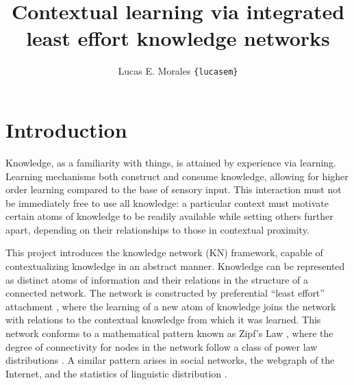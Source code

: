 \documentclass[11pt,letterpaper]{article}
\title{{\Large Contextual learning via integrated least effort knowledge networks}}
\author{Lucas E. Morales \texttt{\{lucasem\}}}
\date{}
\begin{document}
\maketitle

\section{Introduction}

Knowledge, as a familiarity with things, is attained by experience via
learning. Learning mechanisms both construct and consume knowledge, allowing
for higher order learning compared to the base of sensory input. This
interaction must not be immediately free to use all knowledge: a particular
context must motivate certain atoms of knowledge to be readily available
while setting others further apart, depending on their relationships to
those in contextual proximity.

This project introduces the knowledge network (KN) framework, capable of
contextualizing knowledge in an abstract manner. Knowledge can be
represented as distinct atoms of information and their relations in the
structure of a connected network. The network is constructed by preferential
``least effort'' attachment \cite{cancho03}, where the learning of a new
atom of knowledge joins the network with relations to the contextual
knowledge from which it was learned. This network conforms to a mathematical
pattern known as Zipf's Law \cite{zipf49}, where the degree of connectivity
for nodes in the network follow a class of power law distributions
\cite{barabasi99}. A similar pattern arises in social networks, the webgraph
of the Internet, and the statistics of linguistic distribution
\cite{clauset09}.

% 
\end{document}
